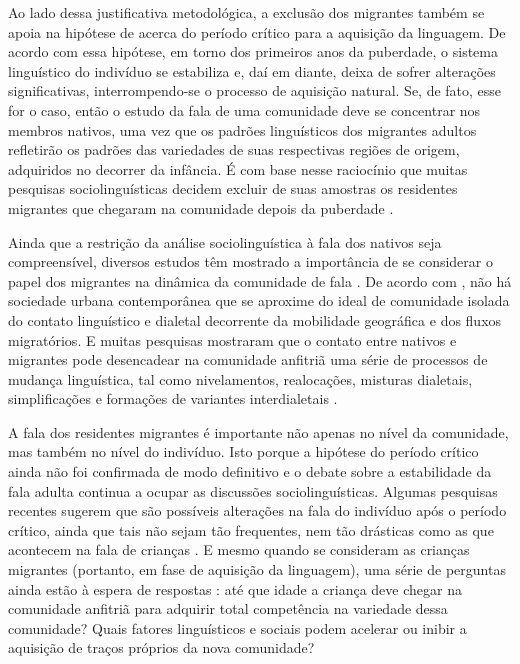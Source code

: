 \documentclass[
    a4paper,	%
    12pt,	%
    ]{article}	%
\begin{document}
Ao lado dessa justificativa metodológica, a exclusão dos migrantes também se
apoia na hipótese de \citet{Lenneberg1967} acerca do período crítico para a
aquisição da linguagem. De acordo com essa hipótese, em torno dos primeiros anos
da puberdade, o sistema linguístico do indivíduo se estabiliza e, daí em diante,
deixa de sofrer alterações significativas, interrompendo-se o processo de
aquisição natural. Se, de fato, esse for o caso, então o estudo da fala de uma
comunidade deve se concentrar nos membros nativos, uma vez que os padrões
linguísticos dos migrantes adultos refletirão os padrões das variedades de suas
respectivas regiões de origem, adquiridos no decorrer da infância. É com base
nesse raciocínio que muitas pesquisas sociolinguísticas decidem excluir de suas
amostras os residentes migrantes que chegaram na comunidade depois da puberdade
\citep[p. ex.][p. 111]{Labov1966}.

Ainda que a restrição da análise sociolinguística à fala dos nativos seja
compreensível, diversos estudos têm mostrado a importância de se considerar o
papel dos migrantes na dinâmica da comunidade de fala \citep{Britain2018,
Bortoni.Ricardo2011, Trudgill1986}. De acordo com \citet{Milroy2002}, não há
sociedade urbana contemporânea que se aproxime do ideal de comunidade isolada do
contato linguístico e dialetal decorrente da mobilidade geográfica e dos fluxos
migratórios. E muitas pesquisas mostraram que o contato entre nativos e
migrantes pode desencadear na comunidade anfitriã uma série de processos de
mudança linguística, tal como nivelamentos, realocações, misturas dialetais,
simplificações e formações de variantes interdialetais \citep{Trudgill1986}.

A fala dos residentes migrantes é importante não apenas no nível da comunidade,
mas também no nível do indivíduo. Isto porque a hipótese do período crítico
\citep{Lenneberg1967} ainda não foi confirmada de modo definitivo e o debate
sobre a estabilidade da fala adulta continua a ocupar as discussões
sociolinguísticas. Algumas pesquisas recentes sugerem que são possíveis
alterações na fala do indivíduo após o período crítico, ainda que tais não sejam
tão frequentes, nem tão drásticas como as que acontecem na fala de crianças
\citep{CukorAvila.Bailey2013}. E mesmo quando se consideram as crianças
migrantes (portanto, em fase de aquisição da linguagem), uma série de perguntas
ainda estão à espera de respostas \citep{Oushiro2016, Nycz2015, Chambers1992,
Trudgill1986}: até que idade a criança deve chegar na comunidade anfitriã para
adquirir total competência na variedade dessa comunidade? Quais fatores
linguísticos e sociais podem acelerar ou inibir a aquisição de traços próprios
da nova comunidade?
\end{document}
